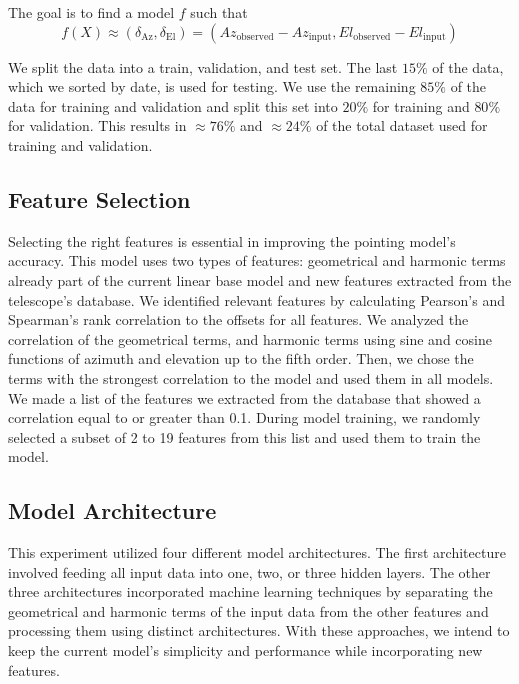 The goal is to find a model $f$ such that
\begin{equation}
    f(X) \approx (\delta_{\text{Az}}, \delta_{\text{El}}) = (Az_{\text{observed}}-Az_{\text{input}}, El_{\text{observed}}-El_{\text{input}})
\end{equation}

We split the data into a train, validation, and test set.
The last $15\%$ of the data, which we sorted by date, is used for testing.
We use the remaining $85\%$ of the data for training and validation and split this set into $20\%$ for training and $80\%$ for validation.
This results in $\approx 76\%$ and $\approx 24\%$ of the total dataset used for training and validation.

\subsection{Feature Selection}
Selecting the right features is essential in improving the pointing model's accuracy.
This model uses two types of features: geometrical and harmonic terms already part of the current linear base model and new features extracted from the telescope's database.
We identified relevant features by calculating Pearson's and Spearman's rank correlation to the offsets for all features.
We analyzed the correlation of the geometrical terms, and harmonic terms using sine and cosine functions of azimuth and elevation up to the fifth order.
Then, we chose the terms with the strongest correlation to the model and used them in all models.
We made a list of the features we extracted from the database that showed a correlation equal to or greater than 0.1.
During model training, we randomly selected a subset of 2 to 19 features from this list and used them to train the model.

\subsection{Model Architecture}
This experiment utilized four different model architectures.
The first architecture involved feeding all input data into one, two, or three hidden layers.
The other three architectures incorporated machine learning techniques by separating the geometrical and harmonic terms of the input data from the other features and processing them using distinct architectures.
With these approaches, we intend to keep the current model's simplicity and performance while incorporating new features.

